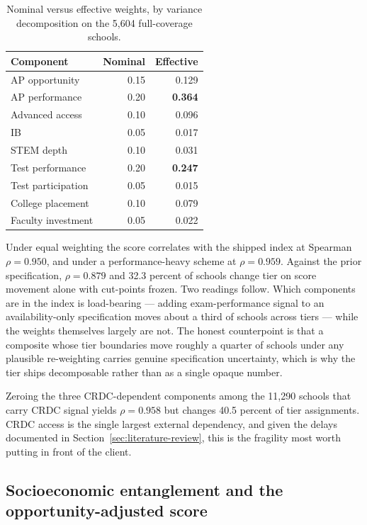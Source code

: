 \documentclass[12pt]{article}
\begin{document}
\begin{table}[htbp]
\centering
\singlespacing\small
\caption{Nominal versus effective weights, by variance decomposition on the 5{,}604 full-coverage schools.}
\label{tab:weights}
\begin{tabular}{@{}lrr@{}}
\toprule
Component & Nominal & Effective \\
\midrule
AP opportunity      & 0.15 & 0.129 \\
AP performance      & 0.20 & \textbf{0.364} \\
Advanced access     & 0.10 & 0.096 \\
IB                  & 0.05 & 0.017 \\
STEM depth          & 0.10 & 0.031 \\
Test performance    & 0.20 & \textbf{0.247} \\
Test participation  & 0.05 & 0.015 \\
College placement   & 0.10 & 0.079 \\
Faculty investment  & 0.05 & 0.022 \\
\bottomrule
\end{tabular}
\end{table}

Under equal weighting the score correlates with the shipped index at Spearman $\rho = 0.950$, and under a performance-heavy scheme at $\rho = 0.959$. Against the prior specification, $\rho = 0.879$ and 32.3 percent of schools change tier on score movement alone with cut-points frozen. Two readings follow. Which components are in the index is load-bearing --- adding exam-performance signal to an availability-only specification moves about a third of schools across tiers --- while the weights themselves largely are not. The honest counterpoint is that a composite whose tier boundaries move roughly a quarter of schools under any plausible re-weighting carries genuine specification uncertainty, which is why the tier ships decomposable rather than as a single opaque number.

Zeroing the three CRDC-dependent components among the 11{,}290 schools that carry CRDC signal yields $\rho = 0.958$ but changes 40.5 percent of tier assignments. CRDC access is the single largest external dependency, and given the delays documented in Section~\ref{sec:literature-review}, this is the fragility most worth putting in front of the client.

\subsection{Socioeconomic entanglement and the opportunity-adjusted score}
\label{sec:ses}
\end{document}
